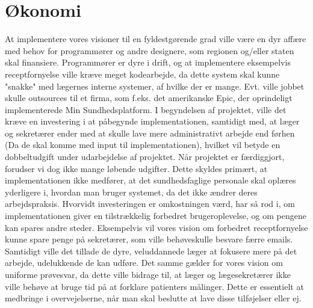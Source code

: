 \section{Økonomi}
At implementere vores visioner til en fyldestgørende grad ville være en dyr affære med behov for programmører og andre designere, som regionen og/eller staten skal finansiere. Programmører er dyre i drift, og at implementere eksempelvis receptfornyelse ville kræve meget kodearbejde, da dette system skal kunne "snakke" med lægernes interne systemer, af hvilke der er mange. Evt. ville jobbet skulle outsources til et firma, som f.eks. det amerikanske Epic, der oprindeligt implementerede Min Sundhedsplatform. I begyndelsen af projektet, ville det kræve en investering i at påbegynde implementationen, samtidigt med, at læger og sekretærer ender med at skulle lave mere administrativt arbejde end førhen (Da de skal komme med input til implementationen), hvilket vil betyde en dobbeltudgift under udarbejdelse af projektet. Når projektet er færdiggjort, forudser vi dog ikke mange løbende udgifter. Dette skyldes primært, at implementationen ikke medfører, at det sundhedsfaglige personale skal oplæres yderligere i, hvordan man bruger systemet, da det ikke ændrer deres arbejdspraksis. Hvorvidt investeringen er omkostningen værd, har så rod i, om implementationen giver en tilstrækkelig forbedret brugeroplevelse, og om pengene kan spares andre steder. Eksempelvis vil vores vision om forbedret receptfornyelse kunne spare penge på sekretærer, som ville behøveskulle besvare færre emails. Samtidigt ville det tillade de dyre, veluddannede læger at fokusere mere på det arbejde, udelukkende de kan udføre. Det samme gælder for vores vision om uniforme prøvesvar, da dette ville bidrage til, at læger og lægesekretærer ikke ville behøve at bruge tid på at forklare patienters målinger. Dette er essentielt at medbringe i overvejelserne, når man skal beslutte at lave disse tilføjelser eller ej. 

